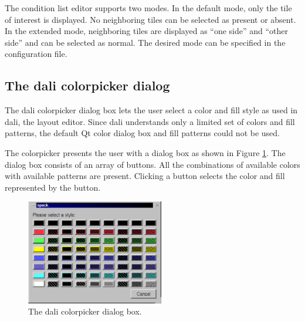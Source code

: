 \bigskip \noindent
The condition list editor supports two modes. In the default mode, only the
tile of interest is displayed. No neighboring tiles can be selected as present
or absent. In the extended mode, neighboring tiles are displayed as ``one
side'' and ``other side'' and can be selected as normal. The desired mode can
be specified in the configuration file.

\subsection{The dali colorpicker dialog}
The dali colorpicker dialog box lets the user select a color and fill style as
used in dali, the layout editor. Since dali understands only a limited set of
colors and fill patterns, the default Qt color dialog box and fill patterns
could not be used.

The colorpicker presents the user with a dialog box as shown in Figure
\ref{fig:uidesign:dalicolorpicker}. The dialog box consists of an array of
buttons. All the combinations of available colors with available patterns are
present. Clicking a button selects the color and fill represented by the
button.

\begin{figure}[hb] \begin{center}
\includegraphics[width=6cm]{./figures/dalicolor.eps}
\caption{The dali colorpicker dialog box.}
\label{fig:uidesign:dalicolorpicker}
\end{center} \end{figure}
